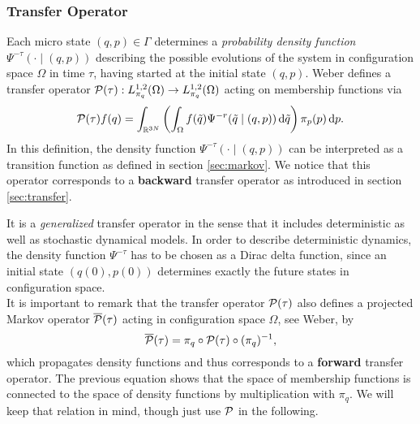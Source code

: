 \subsubsection*{Transfer Operator}
Each micro state $(q,p) \in \Gamma$ determines a \textit{probability density function} $\Psi^{-\tau}(\cdot \mid (q,p))$ describing the possible evolutions of the system in configuration space $\Omega$ in time $\tau$, having started at the initial state $(q,p)$.
Weber\cite{weber2011subspace} defines a transfer operator $\mathcal{P} (\tau): L^{1,2}_{\pi_q}(\Omega) \rightarrow L^{1,2}_{\pi_q}(\Omega)$ acting on membership functions via %
\begin{equation}
\label{eq:transferoperator}
\mathcal{P}(\tau)f(q) = \int_{\mathbb{R}^{3N}} \left( \int_\Omega f(\tilde{q})\Psi^{-r}(\tilde{q}\mid (q,p)) \mathop{}\!\mathrm{d} \tilde{q} \right) \pi_p(p)\mathop{}\!\mathrm{d} p.
\end{equation}
In this definition, the density function $\Psi^{-\tau}(\cdot \mid (q,p))$ can be interpreted as a transition function as defined in section \ref{sec:markov}.
We notice that this operator corresponds to a \textbf{backward} transfer operator as introduced in section \ref{sec:transfer}. %

It is a \textit{generalized} transfer operator in the sense that it includes deterministic as well as stochastic dynamical models. In order to describe deterministic dynamics, the density function $\Psi^{-\tau}$ has to be chosen as a Dirac delta function, since an initial state $(q(0),p(0))$ determines exactly the future states in configuration space.
\\

It is important to remark that the transfer operator $\mathcal{P}(\tau)$ also defines a projected Markov operator $\overline{\mathcal{P}} (\tau)$ acting in configuration space $\Omega$, see Weber\cite{weber2011subspace}, by
\begin{equation}
\label{eq:markov_operator}
\overline{\mathcal{P}} (\tau) = \pi_q \circ \mathcal{P}(\tau) \circ (\pi_q)^{-1},
\end{equation}
which propagates density functions and thus corresponds to a \textbf{forward} transfer operator.
The previous equation shows that the space of membership functions is connected to the space of density functions by multiplication with $\pi_q$.
We will keep that relation in mind, though just use $\mathcal{P}$ in the following.
\\

